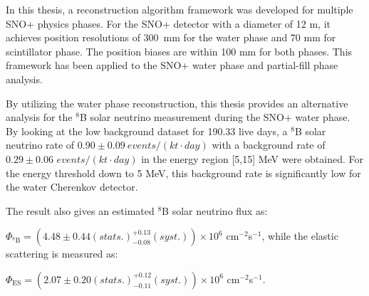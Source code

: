 In this thesis, a reconstruction algorithm framework was developed for multiple SNO+ physics phases. For the SNO+ detector with a diameter of 12 m, it achieves position resolutions of 300~mm for the water phase and 70 mm for scintillator phase. The position biases are within 100 mm for both phases. This framework has been applied to the SNO+ water phase and partial-fill phase analysis. 

By utilizing the water phase reconstruction, this thesis provides an alternative analysis for the $^8$B solar neutrino measurement during the SNO+ water phase. By looking at the low background dataset for 190.33 live days, a $^8$B solar neutrino rate of $0.90\pm0.09~events/(kt\cdot day)$ with a background rate of $0.29\pm 0.06$ $events/(kt\cdot day)$ in the energy region [5,15] MeV were obtained. For the energy threshold down to 5 MeV, this background rate is significantly low for the water Cherenkov detector.

The result also gives an estimated $^8$B solar neutrino flux as: 

$\Phi_{\mathrm{^8B}}=(4.48 \pm 0.44(stats.)^{+0.13}_{-0.08}(syst.))\times10^6$ cm$^{-2}$s$^{-1}$, 
while the elastic scattering is measured as: 

$\Phi_{\mathrm{ES}}=(2.07 \pm 0.20(stats.)^{+0.12}_{-0.11}(syst.))\times10^6$ cm$^{-2}$s$^{-1}$.

